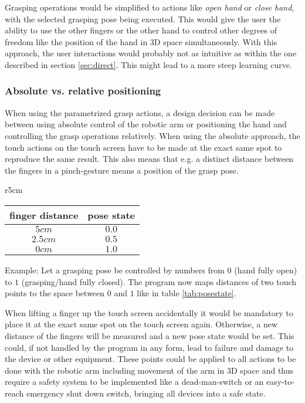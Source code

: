 \documentclass[a4paper]{article}
\begin{document}
Grasping operations would be simplified to actions like \textit{open hand} or \textit{close hand}, with the selected grasping pose being executed. This would give the user the ability to use the other fingers or the other hand to control other degrees of freedom like the position of the hand in 3D space simultaneously. With this approach, the user interactions would probably not as intuitive as within the one described in section \ref{sec:direct}. This might lead to a more steep learning curve.

\subsubsection{Absolute vs. relative positioning}

When using the parametrized grasp actions, a design decision can be made between using absolute control of the robotic arm or positioning the hand and controlling the grasp operations relatively. When using the absolute approach, the touch actions on the touch screen have to be made at the exact same spot to reproduce the same result. This also means that e.g. a distinct distance between the fingers in a  pinch-gesture means a position of the grasp pose. 

\begin{wraptable}{r}{5cm}
	
	\begin{tabular}{|c|c|}
		\hline
		finger distance&pose state \\
		\hline
		$5cm$&$0.0$ \\
		$2.5cm$&$0.5$ \\
		$0cm$&$1.0$ \\
		\hline
	\end{tabular}
	\caption{Finger distance to pose state mapping (ex.)\label{tab:posestate}}
\end{wraptable}


Example: Let a grasping pose be controlled by numbers from $0$ (hand fully open) to $1$ (grasping/hand fully closed). The program now maps distances of two touch points to the space between $0$ and $1$ like in table \ref{tab:posestate}.

When lifting a finger up the touch screen accidentally it would be mandatory to place it at the exact same spot on the touch screen again. Otherwise, a new distance of the fingers will be measured and a new pose state would be set. This could, if not handled by the program in any form, lead to failure and damage to the device or other equipment. These points could be applied to all actions to be done with the robotic arm including movement of the arm in 3D space and thus require a safety system to be implemented like a dead-man-switch or an easy-to-reach emergency shut down switch, bringing all devices into a safe state.
\end{document}
